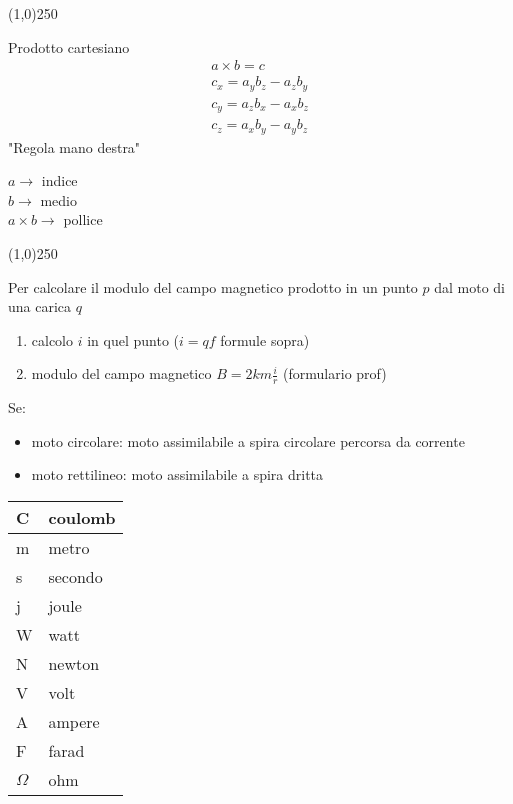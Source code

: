 \documentclass[14pt]{extarticle}
\begin{document}
\begin{center}
    \line(1,0){250}
\end{center}
Prodotto cartesiano
\begin{align*}
    a\times b=c\\
    c_x=a_yb_z-a_zb_y\\
    c_y=a_zb_x-a_xb_z\\
    c_z=a_xb_y-a_yb_z
\end{align*}
"Regola mano destra"
\begin{center}
    $a \rightarrow$ indice\\
    $b \rightarrow$ medio\\
    $a\times b \rightarrow$ pollice
\end{center}
\begin{center}
    \line(1,0){250}
\end{center}

Per calcolare il modulo del campo magnetico prodotto in un punto $p$ dal moto di una carica $q$
\begin{enumerate}
    \item calcolo $i$ in quel punto ($i=qf$ formule sopra)
    \item modulo del campo magnetico $B=2km\frac{i}{r}$ (formulario prof) 
\end{enumerate}
Se:
\begin{itemize}
    \item moto circolare: moto assimilabile a spira circolare percorsa da corrente
    \item moto rettilineo: moto assimilabile a spira dritta
\end{itemize}

    \begin{tabular}{l|l}
    C & coulomb \\ \hline
    m & metro   \\ \hline
    s & secondo \\ \hline
    j & joule   \\ \hline
    W & watt    \\ \hline
    N & newton  \\ \hline
    V & volt    \\ \hline
    A & ampere  \\ \hline
    F & farad   \\ \hline
    $\Omega$ & ohm    
    \end{tabular}
\end{document}
